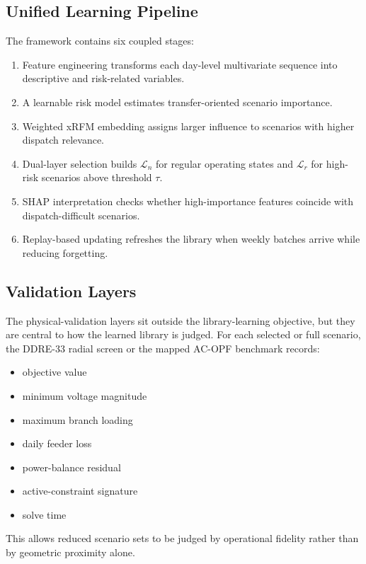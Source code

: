 \documentclass[journal]{IEEEtran}
\begin{document}
\subsection{Unified Learning Pipeline}
The framework contains six coupled stages:
\begin{enumerate}
\item Feature engineering transforms each day-level multivariate sequence into descriptive and risk-related variables.
\item A learnable risk model estimates transfer-oriented scenario importance.
\item Weighted xRFM embedding assigns larger influence to scenarios with higher dispatch relevance.
\item Dual-layer selection builds $\mathcal{L}_n$ for regular operating states and $\mathcal{L}_r$ for high-risk scenarios above threshold $\tau$.
\item SHAP interpretation checks whether high-importance features coincide with dispatch-difficult scenarios.
\item Replay-based updating refreshes the library when weekly batches arrive while reducing forgetting.
\end{enumerate}

\subsection{Validation Layers}
The physical-validation layers sit outside the library-learning objective, but they are central to how the learned library is judged. For each selected or full scenario, the DDRE-33 radial screen or the mapped AC-OPF benchmark records:
\begin{itemize}
\item objective value
\item minimum voltage magnitude
\item maximum branch loading
\item daily feeder loss
\item power-balance residual
\item active-constraint signature
\item solve time
\end{itemize}
This allows reduced scenario sets to be judged by operational fidelity rather than by geometric proximity alone.
\end{document}
